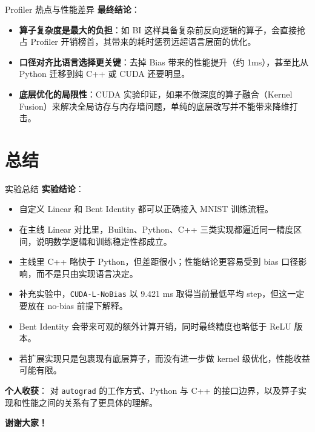 \documentclass[10pt, aspectratio=169]{beamer}
\begin{document}
\begin{frame}{Profiler 热点与性能差异}
    \textbf{最终结论}：
    \begin{itemize}
        \item \textbf{算子复杂度是最大的负担}：如 BI 这样具备复杂前反向逻辑的算子，会直接抢占 Profiler 开销榜首，其带来的耗时惩罚远超语言层面的优化。
        \item \textbf{口径对齐比语言选择更关键}：去掉 Bias 带来的性能提升（约 1ms），甚至比从 Python 迁移到纯 C++ 或 CUDA 还要明显。
        \item \textbf{底层优化的局限性}：CUDA 实验印证，如果不做深度的算子融合（Kernel Fusion）来解决全局访存与内存墙问题，单纯的底层改写并不能带来降维打击。
    \end{itemize}
\end{frame}

\section{总结}

\begin{frame}{实验总结}
    \textbf{实验结论}：
    \begin{itemize}
        \item 自定义 Linear 和 Bent Identity 都可以正确接入 MNIST 训练流程。
        \item 在主线 Linear 对比里，Builtin、Python、C++ 三类实现都逼近同一精度区间，说明数学逻辑和训练稳定性都成立。
        \item 主线里 C++ 略快于 Python，但差距很小；性能结论更容易受到 bias 口径影响，而不是只由实现语言决定。
        \item 补充实验中，\texttt{CUDA-L-NoBias} 以 9.421 ms 取得当前最低平均 step，但这一定要放在 no-bias 前提下解释。
        \item Bent Identity 会带来可观的额外计算开销，同时最终精度也略低于 ReLU 版本。
        \item 若扩展实现只是包裹现有底层算子，而没有进一步做 kernel 级优化，性能收益可能有限。
    \end{itemize}

    \vspace{0.2cm}
    \textbf{个人收获}：
    对 \texttt{autograd} 的工作方式、Python 与 C++ 的接口边界，以及算子实现和性能之间的关系有了更具体的理解。
\end{frame}

\begin{frame}
    \centering
    \Huge \textbf{谢谢大家！}
\end{frame}
\end{document}

